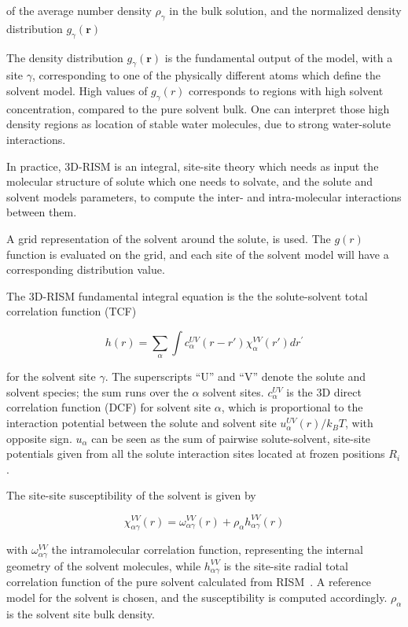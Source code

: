 \documentclass[fleqn,10pt]{wlscirep}
\begin{document}
of the average number density $\rho_{\gamma}$ in the bulk solution, and the
normalized density distribution $g_{\gamma}(\mathbf{r})$

The density distribution $g_{\gamma}(\mathbf{r})$ is the fundamental output of the model, with a site $\gamma$, corresponding to one of the physically different atoms which define the solvent model. 
High values of $g_{\gamma}(r)$ corresponds to regions with high solvent concentration, compared to the pure solvent bulk. One can interpret those high density regions as
location of stable water molecules, due to strong water-solute interactions.

In practice, 3D-RISM is an integral, site-site theory which needs as input the molecular structure of solute which one needs to solvate, and the solute and solvent models parameters, to compute the inter- and intra-molecular interactions between them.

A grid representation of the solvent around the solute, is used. The $g(r)$ function is evaluated on the grid, and each site of the solvent model will have a corresponding distribution value.

The 3D-RISM fundamental integral equation is the the solute-solvent total correlation function (TCF)~\cite{kovalenko_three-dimensional_2003SI,kovalenko_self-consistent_1999,luchko_three-dimensional_2010}

\begin{equation}
    h(r) = \sum_\alpha \int  c_\alpha^{UV}(r - r')\chi_{\alpha}^{VV}(r') dr^\prime
\end{equation}


for the solvent site $\gamma$. The superscripts ``U'' and ``V'' denote the solute and solvent species; the sum runs over the $\alpha$ solvent sites. $c_\alpha^{UV}$ is the 3D direct correlation function (DCF) for solvent site $\alpha$, which is proportional to the interaction potential between the solute and solvent site $u_\alpha^{UV}(r)/k_{B}T$, with opposite sign. $u_\alpha$ can be seen as the sum of pairwise solute-solvent, site-site potentials given from all the solute interaction sites located at frozen positions $R_i$.

The site-site susceptibility of the solvent is given by

\begin{equation}
\chi_{\alpha\gamma}^{VV}(r) = \omega_{\alpha\gamma}^{VV}(r) + \rho_\alpha h_{\alpha\gamma}^{VV}(r) 
\end{equation}

with $\omega_{\alpha\gamma}^{VV}$ the intramolecular correlation function,  representing the internal geometry of the solvent molecules, while $h_{\alpha\gamma}^{VV}$ is the site-site radial total correlation function of the pure solvent calculated from RISM~\cite{chandler_optimized_1972SI,beglov_integral_1997SI,perkyns_sitesite_1992,perkyns_dielectrically_1992}. A reference model for the solvent is chosen, and the susceptibility is computed accordingly. $\rho_\alpha$ is the solvent site bulk density.  
\end{document}
